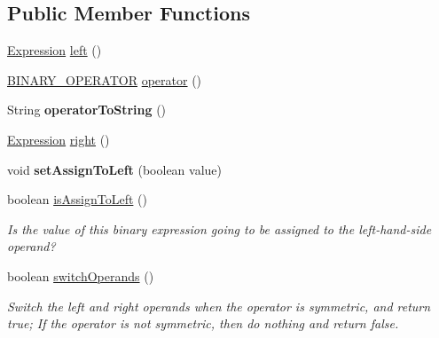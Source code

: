 \subsection*{Public Member Functions}
\begin{DoxyCompactItemize}
\item 
\hyperlink{interfaceedu_1_1udel_1_1cis_1_1vsl_1_1civl_1_1model_1_1IF_1_1expression_1_1Expression}{Expression} \hyperlink{interfaceedu_1_1udel_1_1cis_1_1vsl_1_1civl_1_1model_1_1IF_1_1expression_1_1BinaryExpression_a62914961d56020caf846fb2aa8511572}{left} ()
\item 
\hyperlink{enumedu_1_1udel_1_1cis_1_1vsl_1_1civl_1_1model_1_1IF_1_1expression_1_1BinaryExpression_1_1BINARY__OPERATOR}{B\+I\+N\+A\+R\+Y\+\_\+\+O\+P\+E\+R\+A\+T\+O\+R} \hyperlink{interfaceedu_1_1udel_1_1cis_1_1vsl_1_1civl_1_1model_1_1IF_1_1expression_1_1BinaryExpression_a960322d11a1161926b0c6fa87f045b76}{operator} ()
\item 
\hypertarget{interfaceedu_1_1udel_1_1cis_1_1vsl_1_1civl_1_1model_1_1IF_1_1expression_1_1BinaryExpression_a180987c431a96aa1d22871d0278e2933}{}String {\bfseries operator\+To\+String} ()\label{interfaceedu_1_1udel_1_1cis_1_1vsl_1_1civl_1_1model_1_1IF_1_1expression_1_1BinaryExpression_a180987c431a96aa1d22871d0278e2933}

\item 
\hyperlink{interfaceedu_1_1udel_1_1cis_1_1vsl_1_1civl_1_1model_1_1IF_1_1expression_1_1Expression}{Expression} \hyperlink{interfaceedu_1_1udel_1_1cis_1_1vsl_1_1civl_1_1model_1_1IF_1_1expression_1_1BinaryExpression_a7efa824ca6b6bbf395007bd15441853d}{right} ()
\item 
\hypertarget{interfaceedu_1_1udel_1_1cis_1_1vsl_1_1civl_1_1model_1_1IF_1_1expression_1_1BinaryExpression_a59dabaeb17ac9a75462acc4d35df55de}{}void {\bfseries set\+Assign\+To\+Left} (boolean value)\label{interfaceedu_1_1udel_1_1cis_1_1vsl_1_1civl_1_1model_1_1IF_1_1expression_1_1BinaryExpression_a59dabaeb17ac9a75462acc4d35df55de}

\item 
boolean \hyperlink{interfaceedu_1_1udel_1_1cis_1_1vsl_1_1civl_1_1model_1_1IF_1_1expression_1_1BinaryExpression_afb4db30f174d08b283c0e3b025172ac4}{is\+Assign\+To\+Left} ()
\begin{DoxyCompactList}\small\item\em Is the value of this binary expression going to be assigned to the left-\/hand-\/side operand? \end{DoxyCompactList}\item 
boolean \hyperlink{interfaceedu_1_1udel_1_1cis_1_1vsl_1_1civl_1_1model_1_1IF_1_1expression_1_1BinaryExpression_a02f9d50fec00223782437d56c4ce7def}{switch\+Operands} ()
\begin{DoxyCompactList}\small\item\em Switch the left and right operands when the operator is symmetric, and return true; If the operator is not symmetric, then do nothing and return false. \end{DoxyCompactList}\end{DoxyCompactItemize}


